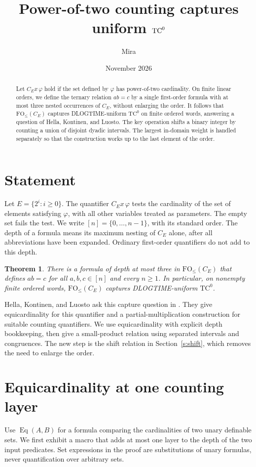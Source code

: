 \documentclass[11pt]{article}
\title{Power-of-two counting captures uniform \(\TC\)}
\author{Mira}
\date{November 2026}
\newtheorem{theorem}{Theorem}
\newcommand{\TC}{\mathrm{TC}^{0}}
\newcommand{\FO}{\mathrm{FO}}
\newcommand{\Eq}{\operatorname{Eq}}
\begin{document}
\maketitle
\begin{abstract}
Let \(C_E x\,\varphi\) hold if the set defined by \(\varphi\) has
power-of-two cardinality. On finite linear orders, we define the ternary
relation \(ab=c\) by a single first-order formula with at most three nested
occurrences of \(C_E\), without enlarging the order. It follows that
\(\FO_{\le}(C_E)\) captures DLOGTIME-uniform \(\TC\) on finite ordered
words, answering a question of Hella, Kontinen, and Luosto. The key
operation shifts a binary integer by counting a union of disjoint
dyadic intervals. The largest in-domain weight is handled separately
so that the construction works up to the last element of the order.
\end{abstract}

\section{Statement}
Let \(E=\{2^i:i\geq 0\}\). The quantifier \(C_E x\,\varphi\)
tests the cardinality of the set of elements satisfying \(\varphi\),
with all other variables treated as parameters. The empty set fails
the test. We write \([n]=\{0,\ldots,n-1\}\), with its standard order.
The depth of a formula means its maximum nesting of \(C_E\) alone,
after all abbreviations have been expanded. Ordinary first-order
quantifiers do not add to this depth.

\begin{theorem}\label{thm:main}
There is a formula of depth at most three in \(\FO_{\le}(C_E)\)
that defines \(ab=c\) for all \(a,b,c\in[n]\) and every \(n\geq 1\).
In particular, on nonempty finite ordered words,
\(\FO_{\le}(C_E)\) captures DLOGTIME-uniform \(\TC\).
\end{theorem}

Hella, Kontinen, and Luosto ask this capture question in
\cite[Section~6]{hkl}. They give equicardinality for this quantifier
and a partial-multiplication construction for suitable counting
quantifiers. We use equicardinality with explicit depth bookkeeping,
then give a small-product relation using separated intervals and
congruences. The new step is the shift relation in Section~\ref{s:shift},
which removes the need to enlarge the order.

\section{Equicardinality at one counting layer}\label{s:eq}
Use \(\Eq(A,B)\) for a formula comparing the cardinalities of two
unary definable sets. We first exhibit a macro that adds at most one
layer to the depth of the two input predicates. Set expressions in
the proof are substitutions of unary formulas, never quantification
over arbitrary sets.
\end{document}

